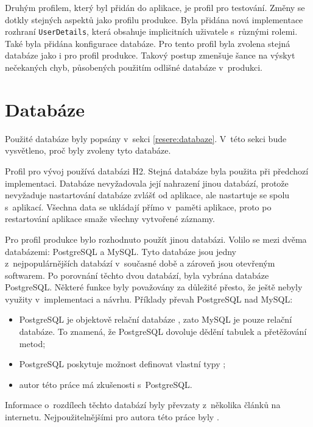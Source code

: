     Druhým profilem, který byl přidán do aplikace, je profil pro testování. Změny se dotkly stejných aspektů jako profilu produkce. Byla přidána nová implementace rozhraní \verb|UserDetails|, která obsahuje implicitních uživatele s~různými rolemi. Také byla přidána konfigurace databáze. Pro tento profil byla zvolena stejná databáze jako i pro profil produkce. Takový postup zmenšuje šance na výskyt nečekaných chyb, působených použitím odlišné databáze v~produkci.
    
\section{Databáze} \label{navrh:db}
    Použité databáze byly popsány v~sekci \ref{resere:databaze}. V~této sekci bude vysvětleno, proč byly zvoleny tyto databáze.
    
    Profil pro vývoj používá databázi H2. Stejná databáze byla použita při předchozí implementaci. Databáze nevyžadovala její nahrazení jinou databází, protože nevyžaduje nastartování databáze zvlášť od aplikace, ale nastartuje se spolu s~aplikací. Všechna data se ukládají přímo v~paměti aplikace, proto po restartování aplikace smaže všechny vytvořené záznamy.
    
    Pro profil produkce bylo rozhodnuto použít jinou databázi. Volilo se mezi dvěma databázemi: PostgreSQL a MySQL. Tyto databáze jsou jedny z~nejpopulárnějších databází v~současné době a zároveň jsou otevřeným softwarem. Po porovnání těchto dvou databází, byla vybrána databáze PostgreSQL. Některé funkce byly považovány za důležité přesto, že ještě nebyly využity v~implementaci a návrhu. Příklady převah PostgreSQL nad MySQL: 
    \begin{itemize}
            \setlength\itemsep{0.3em}
            \item PostgreSQL je objektově relační databáze \cite{postgres-about}, zato MySQL je pouze relační databáze. To znamená, že PostgreSQL dovoluje dědění tabulek a přetěžování metod;
            \item PostgreSQL poskytuje možnost definovat vlastní typy \cite{pstgres-create-type};
            \item autor této práce má zkušenosti s~PostgreSQL.
    \end{itemize}
    Informace o~rozdílech těchto databází byly převzaty z~několika článků na internetu. Nejpoužitelnějšími pro autora této práce byly \cite{mysql-postgres1, mysql-postgres2}.
    
